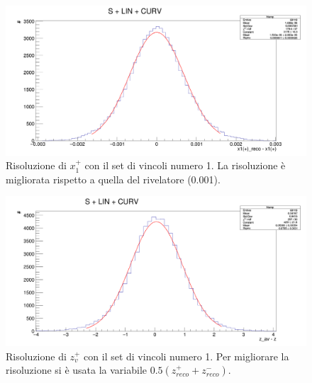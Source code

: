 \documentclass[8pt]{extarticle}
\begin{document}
\begin{figure} [h!]
	\begin{center}
		\includegraphics[scale=0.25]{set_1_x} 
		\caption{Risoluzione di $x_1^+$ con il set di vincoli numero 1. La risoluzione è migliorata rispetto a quella del rivelatore (0.001).}
		\label{fig:set_1_x}
	\end{center}
\end{figure}

\begin{figure} [h!]
	\begin{center}
		\includegraphics[scale=0.25]{set_1_z} 
		\caption{Risoluzione di $z_v^+$ con il set di vincoli numero 1. Per migliorare la risoluzione si è usata la variabile $0.5(z^+_{reco}+z^-_{reco})$.}
		\label{fig:set_1_z}
	\end{center}
\end{figure}
\end{document}
